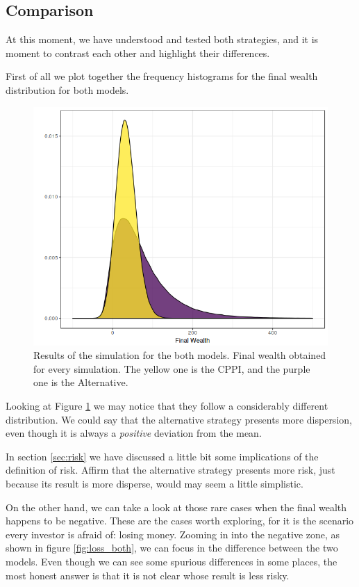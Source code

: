 \subsection{Comparison}

At this moment, we have understood and tested both strategies, and it is moment to contrast each other and highlight their differences.

First of all we plot together the frequency histograms for the final wealth distribution for both models.

\begin{figure}[H]
    \centering
    \includegraphics[scale=0.65]{./images/fw_both.png}
    \caption{Results of the simulation for the both models. Final wealth obtained for every simulation. The yellow one is the CPPI, and the purple one is the Alternative.}
    \label{fig:both_fw}
\end{figure}

Looking at Figure \ref{fig:both_fw} we may notice that they follow a considerably different distribution. We could say that the alternative strategy presents more dispersion, even though it is always a \textit{positive} deviation from the mean.

In section \ref{sec:risk} we have discussed a little bit some implications of the definition of risk. Affirm that the alternative strategy presents more risk, just because its result is more disperse, would may seem a little simplistic.

On the other hand, we can take a look at those rare cases when the final wealth happens to be negative. These are the cases worth exploring, for it is the scenario every investor is afraid of: losing money. Zooming in into the negative zone, as shown in figure \ref{fig:loss_both}, we can focus in the difference between the two models. Even though we can see some spurious differences in some places, the most honest answer is that it is not clear whose result is less risky.

